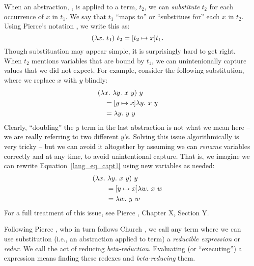 \documentclass[12pt]{report}
\begin{document}
When an abstraction, , is applied to a term, $t_2$, we
can \emph{substitute} $t_2$ for each occurrence of $x$ in $t_1$. We say
that $t_1$ ``maps to'' or ``substitues for'' each $x$ in $t_2$. Using
Pierce's notation \citep{PierceXX}, we write this as:
\begin{equation}
  (\lambda x.\ t_1)\ t_2 = [t_2 \mapsto x] t_1.
\end{equation}
Though substituation may appear simple, it is surprisingly hard to get
right. When $t_2$ mentions variables that are bound by $t_1$, we can
unintenionally capture values that we did not expect. For example,
consider the following substitution, where we replace $x$ with $y$
blindly:
\begin{equation}
  \begin{split}
    & (\lambda x.\ \lambda y.\ x\ y)\ y \\
    & \quad = [y \mapsto x] \lambda y.\ x\ y \\
    & \quad = \lambda y.\ y\ y
  \end{split}
\label{lang_eq_capt1}
\end{equation}
Clearly, ``doubling'' the $y$ term in the last abstraction is not what
we mean here -- we are really referring to two different
$y$'s. Solving this issue algorithmically is very tricky -- but we can
avoid it altogether by assuming we can \emph{rename} variables
correctly and at any time, to avoid unintentional capture. That is, we
imagine we can rewrite Equation~\ref{lang_eq_capt1} using new
variables as needed:
\begin{equation}
  \begin{split}
    & (\lambda x.\ \lambda y.\ x\ y)\ y \\
    & \qquad = [y \mapsto x] \lambda w.\ x\ w \\
    & \qquad = \lambda w.\ y\ w
  \end{split}
\label{lang_eq_capt2}
\end{equation}
For a full treatment of this issue, see Pierce \citep{PierceXX},
Chapter X, Section Y.

Following Pierce \citep{PierceXX}, who in turn follows Church
\citep{ChurchXX}, we call any term where we can use substitution
(i.e., an abstraction applied to term) a \emph{reducible expression}
or \emph{redex}. We call the act of reducing
\emph{beta-reduction}. Evaluating (or ``executing'') a \lamA
expression means finding these redexes and \emph{beta-reducing} them.
\end{document}

